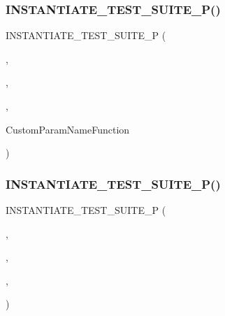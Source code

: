 \mbox{\label{googletest-master_2googletest_2test_2googletest-param-test-test_8cc_a1a12716f19b207a803949487ced6f798}} 
\subsubsection{\texorpdfstring{INSTANTIATE\_TEST\_SUITE\_P()}{INSTANTIATE\_TEST\_SUITE\_P()}\hspace{0.1cm}{\footnotesize\ttfamily [13/20]}}
{\footnotesize\ttfamily I\+N\+S\+T\+A\+N\+T\+I\+A\+T\+E\+\_\+\+T\+E\+S\+T\+\_\+\+S\+U\+I\+T\+E\+\_\+P (\begin{DoxyParamCaption}\item[{Custom\+Param\+Name\+FunctionP}]{,  }\item[{\mbox{\hyperlink{class_custom_function_naming_test}{Custom\+Function\+Naming\+Test}}}]{,  }\item[{Values(std\+::string(\char`\"{}Function\+NameP\char`\"{}))}]{,  }\item[{\&}]{Custom\+Param\+Name\+Function }\end{DoxyParamCaption})}

\mbox{\label{googletest-master_2googletest_2test_2googletest-param-test-test_8cc_a6ba446f001925b3f5081aece4f24401b}} 
\subsubsection{\texorpdfstring{INSTANTIATE\_TEST\_SUITE\_P()}{INSTANTIATE\_TEST\_SUITE\_P()}\hspace{0.1cm}{\footnotesize\ttfamily [14/20]}}
{\footnotesize\ttfamily I\+N\+S\+T\+A\+N\+T\+I\+A\+T\+E\+\_\+\+T\+E\+S\+T\+\_\+\+S\+U\+I\+T\+E\+\_\+P (\begin{DoxyParamCaption}\item[{Custom\+Param\+Name\+Lambda}]{,  }\item[{\mbox{\hyperlink{class_custom_lambda_naming_test}{Custom\+Lambda\+Naming\+Test}}}]{,  }\item[{Values(std\+::string(\char`\"{}Lambda\+Name\char`\"{}))}]{,  }\item[{\mbox{[}$\,$\mbox{]} (const \+::\mbox{\hyperlink{structtesting_1_1_test_param_info}{testing\+::\+Test\+Param\+Info}}$<$ std\+::string $>$ \&inf) \{ return inf.\+param;\}}]{ }\end{DoxyParamCaption})}

